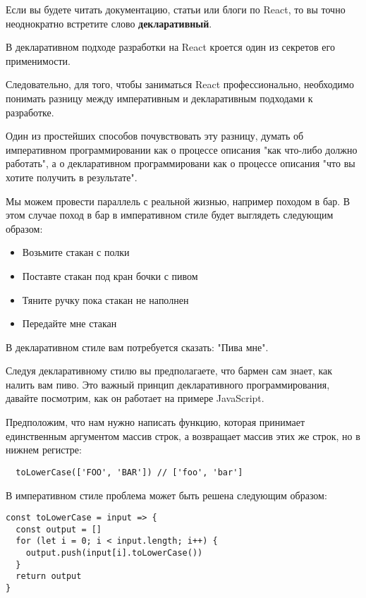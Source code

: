 Если вы будете читать документацию, статьи или блоги по React, то вы точно неоднократно встретите слово \textbf{декларативный}.

В декларативном подходе разработки на React кроется один из секретов его применимости.

Следовательно, для того, чтобы заниматься React профессионально, необходимо понимать разницу между императивным и декларативным подходами к разработке.

Один из простейших способов почувствовать эту разницу, думать об императивном программировании как о процессе описания "как что-либо должно работать", а о декларативном программировани как о процессе описания "что вы хотите получить в результате".

Мы можем провести параллель с реальной жизнью, например походом в бар. В этом случае поход в бар в императивном стиле будет выглядеть следующим образом:

\begin{itemize}
  \item Возьмите стакан с полки
  \item Поставте стакан под кран бочки с пивом
  \item Тяните ручку пока стакан не наполнен
  \item Передайте мне стакан
\end{itemize}

В декларативном стиле вам потребуется сказать: "Пива мне".

Следуя декларативному стилю вы предполагаете, что бармен сам знает, как налить вам пиво. Это важный принцип декларативного программирования, давайте посмотрим, как он работает на примере JavaScript.

Предположим, что нам нужно написать функцию, которая принимает единственным аргументом массив строк, а возвращает массив этих же строк, но в нижнем регистре:

\begin{lstlisting}
  toLowerCase(['FOO', 'BAR']) // ['foo', 'bar']
\end{lstlisting}

В императивном стиле проблема может быть решена следующим образом:

\begin{lstlisting}
const toLowerCase = input => {
  const output = []
  for (let i = 0; i < input.length; i++) {
    output.push(input[i].toLowerCase())
  }
  return output
}
\end{lstlisting}

